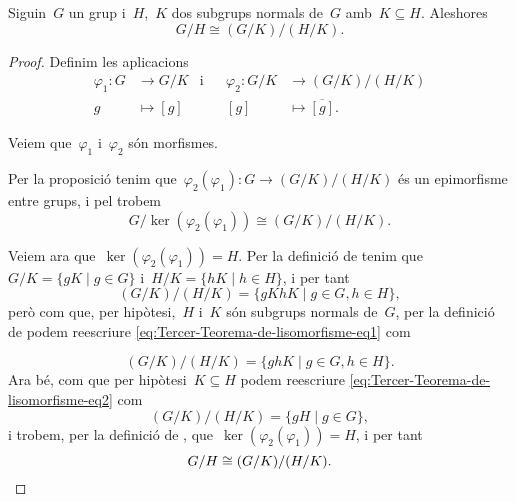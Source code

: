 \documentclass[../estructures-algebraiques.tex]{subfiles}
\begin{document}
    \begin{theorem}
        \label{thm:Tercer-Teorema-de-lisomorfisme-entre-grups}
        Siguin~\(G\) un grup i~\(H\),~\(K\) dos subgrups normals de~\(G\) amb~\(K\subseteq H\).
        Aleshores
        \[
            G/H\cong (G/K)/(H/K).
        \]
    \end{theorem}
    \begin{proof}
        Definim les aplicacions
        \begin{align*}
        \varphi_{1}\colon G&\longrightarrow G/K&\text{i}&&\varphi_{2}\colon G/K&\longrightarrow(G/K)/(H/K)\\
        g&\longmapsto[g]&&&[g]&\longmapsto\overline{[g]}.
        \end{align*}

        Veiem que~\(\varphi_{1}\) i~\(\varphi_{2}\) són morfismes.

        Per la proposició  tenim que~\(\varphi_{2}(\varphi_{1})\colon G\longrightarrow(G/K)/(H/K)\) és un epimorfisme entre grups, %
        i pel  trobem
        \[
            G/\ker(\varphi_{2}(\varphi_{1}))\cong(G/K)/(H/K).
        \]

        Veiem ara que~\(\ker(\varphi_{2}(\varphi_{1}))=H\).
        Per la definició de  tenim que~\(G/K=\{gK\mid g\in G\}\) i~\(H/K=\{hK\mid h\in H\}\), i per tant
        \begin{equation}
        \label{eq:Tercer-Teorema-de-lisomorfisme-eq1}
        (G/K)/(H/K)=\{gKhK\mid g\in G, h\in H\},
        \end{equation}
        però com que, per hipòtesi,~\(H\) i~\(K\) són subgrups normals de~\(G\), per la definició de  podem reescriure \eqref{eq:Tercer-Teorema-de-lisomorfisme-eq1} com

        \begin{equation}\label{eq:Tercer-Teorema-de-lisomorfisme-eq2}
        (G/K)/(H/K)=\{ghK\mid g\in G,h\in H\}.
        \end{equation}
        Ara bé, com que per hipòtesi~\(K\subseteq H\) podem reescriure \eqref{eq:Tercer-Teorema-de-lisomorfisme-eq2} com
        \[
            (G/K)/(H/K)=\{gH\mid g\in G\},
        \]
        i trobem, per la definició de , que~\(\ker(\varphi_{2}(\varphi_{1}))=H\), i per tant
        \[
            G/H\cong (G/K)/(H/K).\qedhere
        \]
    \end{proof}
\end{document}
